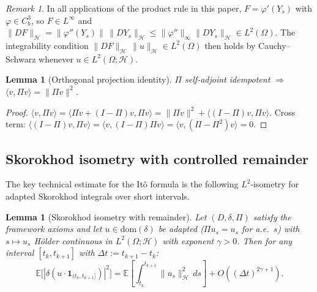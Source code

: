 \documentclass[11pt,a4paper]{article}
\theoremstyle{plain}
\newtheorem{lemma}[theorem]{Lemma}
\theoremstyle{definition}
\theoremstyle{remark}
\newtheorem{remark}[theorem]{Remark}
\newcommand{\E}{\mathbb{E}}
\newcommand{\dom}{\mathrm{dom}}
\begin{document}
\begin{remark}\label{rem:domain}
In all applications of the product rule in this paper, $F = \varphi'(Y_s)$ with $\varphi \in C_b^3$, so $F \in L^\infty$ and $\|DF\|_{\mathcal{H}} = \|\varphi''(Y_s)\|\,\|DY_s\|_{\mathcal{H}} \le \|\varphi''\|_\infty\|DY_s\|_{\mathcal{H}} \in L^2(\Omega)$. The integrability condition $\|DF\|_{\mathcal{H}}\,\|u\|_{\mathcal{H}} \in L^2(\Omega)$ then holds by Cauchy--Schwarz whenever $u \in L^2(\Omega;\mathcal{H})$.
\end{remark}

\begin{lemma}[Orthogonal projection identity]\label{lem:orth}
$\Pi$ self-adjoint idempotent $\Rightarrow$ $\langle v, \Pi v\rangle = \|\Pi v\|^2$.
\end{lemma}

\begin{proof}
$\langle v,\Pi v\rangle = \langle\Pi v+(I-\Pi)v,\Pi v\rangle = \|\Pi v\|^2+\langle(I-\Pi)v,\Pi v\rangle$. Cross term: $\langle(I-\Pi)v,\Pi v\rangle = \langle v,(I-\Pi)\Pi v\rangle = \langle v,(\Pi-\Pi^2)v\rangle = 0$.
\end{proof}


\subsection{Skorokhod isometry with controlled remainder}

The key technical estimate for the It\^o formula is the following $L^2$-isometry for adapted Skorokhod integrals over short intervals.

\begin{lemma}[Skorokhod isometry with remainder]\label{lem:skor_iso}
Let $(D,\delta,\Pi)$ satisfy the framework axioms and let $u \in \dom(\delta)$ be adapted ($\Pi u_s = u_s$ for a.e.~$s$) with $s \mapsto u_s$ H\"older continuous in $L^2(\Omega;\mathcal{H})$ with exponent $\gamma > 0$. Then for any interval $[t_k, t_{k+1}]$ with $\Delta t := t_{k+1}-t_k$:
\begin{equation}\label{eq:skor_iso}
\E\bigl[|\delta(u\cdot\mathbf{1}_{(t_k,t_{k+1}]})|^2\bigr] = \E\!\left[\int_{t_k}^{t_{k+1}}\|u_s\|^2_{\mathcal{H}}\,ds\right] + O((\Delta t)^{2\gamma+1}).
\end{equation}
\end{lemma}
\end{document}
